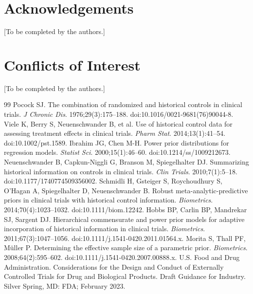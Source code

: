 \documentclass[11pt]{article}
\begin{document}
\section*{Acknowledgements}
[To be completed by the authors.]

\section*{Conflicts of Interest}
[To be completed by the authors.]

\begin{thebibliography}{99}
\small
 Pocock SJ. The combination of randomized and historical controls
in clinical trials. \emph{J Chronic Dis}. 1976;29(3):175--188.
doi:10.1016/0021-9681(76)90044-8.
 Viele K, Berry S, Neuenschwander B, et al. Use of historical
control data for assessing treatment effects in clinical trials. \emph{Pharm
Stat}. 2014;13(1):41--54. doi:10.1002/pst.1589.
 Ibrahim JG, Chen M-H. Power prior distributions for regression
models. \emph{Statist Sci}. 2000;15(1):46--60. doi:10.1214/ss/1009212673.
 Neuenschwander B, Capkun-Niggli G, Branson M, Spiegelhalter DJ.
Summarizing historical information on controls in clinical trials. \emph{Clin
Trials}. 2010;7(1):5--18. doi:10.1177/1740774509356002.
 Schmidli H, Gsteiger S, Roychoudhury S, O'Hagan A, Spiegelhalter
D, Neuenschwander B. Robust meta-analytic-predictive priors in clinical trials
with historical control information. \emph{Biometrics}. 2014;70(4):1023--1032.
doi:10.1111/biom.12242.
 Hobbs BP, Carlin BP, Mandrekar SJ, Sargent DJ. Hierarchical
commensurate and power prior models for adaptive incorporation of historical
information in clinical trials. \emph{Biometrics}. 2011;67(3):1047--1056.
doi:10.1111/j.1541-0420.2011.01564.x.
 Morita S, Thall PF, M\"uller P. Determining the effective sample
size of a parametric prior. \emph{Biometrics}. 2008;64(2):595--602.
doi:10.1111/j.1541-0420.2007.00888.x.
 U.S. Food and Drug Administration. Considerations for the Design
and Conduct of Externally Controlled Trials for Drug and Biological Products.
Draft Guidance for Industry. Silver Spring, MD: FDA; February 2023.

\end{thebibliography}
\end{document}
